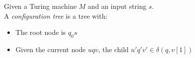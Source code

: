 \begin{definition} Given a Turing machine $M$ and an input string $s$.
\\A \textit{configuration tree} is a tree with:
\begin{itemize}
    \item The root node is $q_0 s$
    \item Given the current node $u q v$, the child $u' q' v' \in \delta(q, v[1])$
\end{itemize}
\end{definition}


